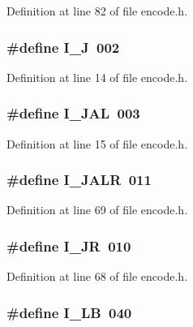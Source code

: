 Definition at line 82 of file encode.\+h.

\subsubsection[{I\+\_\+J}]{\setlength{\rightskip}{0pt plus 5cm}\#define I\+\_\+J~002}\label{encode_8h_aa23a69db29128c463348448d76ee89af}


Definition at line 14 of file encode.\+h.

\subsubsection[{I\+\_\+\+J\+AL}]{\setlength{\rightskip}{0pt plus 5cm}\#define I\+\_\+\+J\+AL~003}\label{encode_8h_afd17b34675532098e7f7a665d00f8fd3}


Definition at line 15 of file encode.\+h.

\subsubsection[{I\+\_\+\+J\+A\+LR}]{\setlength{\rightskip}{0pt plus 5cm}\#define I\+\_\+\+J\+A\+LR~011}\label{encode_8h_a687a7eff53b1c70b2a99af3de8e364aa}


Definition at line 69 of file encode.\+h.

\subsubsection[{I\+\_\+\+JR}]{\setlength{\rightskip}{0pt plus 5cm}\#define I\+\_\+\+JR~010}\label{encode_8h_acb006c5603c39dfc5a172b6829e0a3fa}


Definition at line 68 of file encode.\+h.

\subsubsection[{I\+\_\+\+LB}]{\setlength{\rightskip}{0pt plus 5cm}\#define I\+\_\+\+LB~040}\label{encode_8h_af758268e391d0842d646495995f0cee5}


